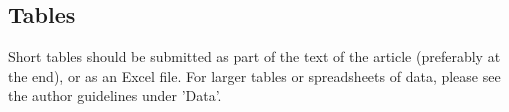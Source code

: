 \subsection{Tables}
Short tables should be submitted as part of the text of the article (preferably at the end), or as an Excel file.
For larger tables or spreadsheets of data, please see the author guidelines under 'Data'.

